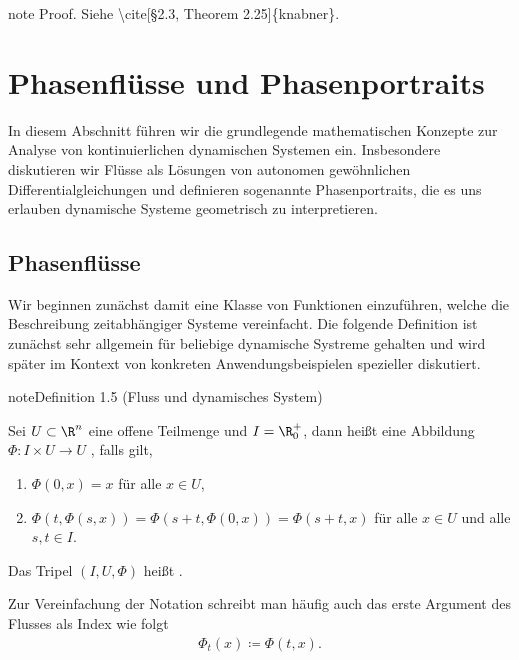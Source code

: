 \documentclass[letterpaper,10pt,english]{jupyterBook}
\begin{document}
\begin{sphinxadmonition}{note}
\sphinxAtStartPar
Proof. Siehe \textbackslash{}cite{[}§2.3, Theorem 2.25{]}\{knabner\}.
\end{sphinxadmonition}


\section{Phasenflüsse und Phasenportraits}
\label{\detokenize{ode/fluesse:phasenflusse-und-phasenportraits}}\label{\detokenize{ode/fluesse:s-fluesse}}\label{\detokenize{ode/fluesse::doc}}
\sphinxAtStartPar
In diesem Abschnitt führen wir die grundlegende mathematischen Konzepte zur Analyse von kontinuierlichen dynamischen Systemen ein. Insbesondere diskutieren wir Flüsse als Lösungen von autonomen gewöhnlichen Differentialgleichungen und definieren sogenannte Phasenportraits, die es uns erlauben dynamische Systeme geometrisch zu interpretieren.


\subsection{Phasenflüsse}
\label{\detokenize{ode/fluesse:phasenflusse}}
\sphinxAtStartPar
Wir beginnen zunächst damit eine Klasse von Funktionen einzuführen, welche die Beschreibung zeitabhängiger Systeme vereinfacht.
Die folgende Definition ist zunächst sehr allgemein für beliebige dynamische Systreme gehalten und wird später im Kontext von konkreten Anwendungsbeispielen spezieller diskutiert.
\label{ode/fluesse:def:Fluss}
\begin{sphinxadmonition}{note}{Definition 1.5 (Fluss und dynamisches System)}



\sphinxAtStartPar
Sei \(U \subset \R^n\) eine offene Teilmenge und \(I=\R^+_0\), dann heißt eine Abbildung \(\Phi:I\times U\rightarrow U\) , falls gilt,
\begin{enumerate}
%
\item {} 
\sphinxAtStartPar
\(\Phi(0, x) = x\) für alle \(x\in U\),

\item {} 
\sphinxAtStartPar
\(\Phi(t, \Phi(s,x)) = \Phi(s + t, \Phi(0, x)) = \Phi(s + t, x)\) für alle \(x\in U\) und alle \(s,t\in I\).

\end{enumerate}

\sphinxAtStartPar
Das Tripel \((I, U, \Phi)\) heißt .

\sphinxAtStartPar
Zur Vereinfachung der Notation schreibt man häufig auch das erste Argument des Flusses als Index wie folgt
\begin{equation*}
\begin{split}\Phi_t(x) \coloneqq \Phi(t, x).\end{split}
\end{equation*}\end{sphinxadmonition}
\end{document}
